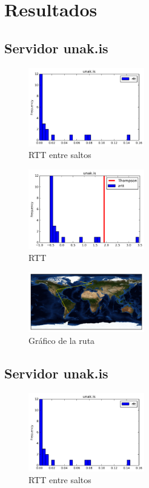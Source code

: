 \section{Resultados}
\subsection{Servidor unak.is}
\begin{figure}[H]
  \centering
    \includegraphics[width=0.45\textwidth]{histogramas_rtt/unak-is.png}
  \caption{RTT entre saltos}
  \label{entropia-s}
\end{figure}

\begin{figure}[H]
  \centering
    \includegraphics[width=0.45\textwidth]{histogramas_thompson/unak-is.png}
  \caption{RTT }
  \label{entropia-s}
\end{figure}

\begin{figure}[H]
  \centering
    \includegraphics[width=0.45\textwidth]{grafico-rutas/unak-is.png}
  \caption{Gráfico de la ruta}
  \label{entropia-s}
\end{figure}




\subsection{Servidor unak.is}
\begin{figure}[H]
  \centering
    \includegraphics[width=0.45\textwidth]{histogramas_rtt/unak-is.png}
  \caption{RTT entre saltos}
  \label{entropia-s}
\end{figure}

